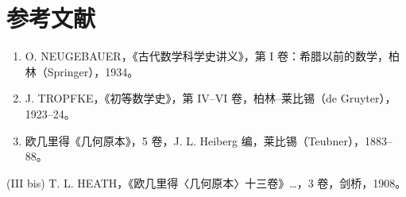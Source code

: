 \section*{参考文献}
{}

\begin{enumerate}
\def\labelenumi{(\Roman{enumi})}
\item
  O. NEUGEBAUER，《古代数学科学史讲义》，第 I 卷：希腊以前的数学，柏林（Springer），1934。
\item
  J. TROPFKE，《初等数学史》，第 IV–VI 卷，柏林–莱比锡（de Gruyter），1923–24。
\item
  欧几里得《几何原本》，5 卷，J. L. Heiberg 编，莱比锡（Teubner），1883–88。
\end{enumerate}

(III bis) T. L. HEATH，《欧几里得〈几何原本〉十三卷》\ldots，3 卷，剑桥，1908。

